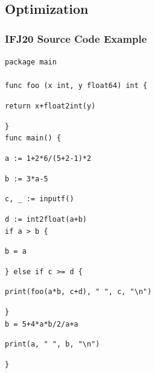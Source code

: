 \documentclass[12pt]{article}
\begin{document}
\begin{figure}
\subsection{Optimization}
\subsubsection{IFJ20 Source Code Example}
\texttt{package main}\\
\\
\texttt{func foo (x int, y float64) int \{}

\hspace{0.8cm}\texttt{return x+float2int(y)}

\texttt{\}}
\\

\texttt{func main() \{}

\hspace{0.8cm}\texttt{a := 1+2\**6/(5+2-1)\**2}

\hspace{0.8cm}\texttt{b := 3\**a-5}

\hspace{0.8cm}\texttt{c, \_ := inputf()}

\hspace{0.8cm}\texttt{d := int2float(a+b)}
\\

\hspace{0.8cm}\texttt{if a > b \{}

\hspace{1.6cm}\texttt{b = a}

\hspace{0.8cm}\texttt{\} else if c >= d \{}

\hspace{1.6cm}\texttt{print(foo(a\**b, c+d), " ", c, "\textbackslash n")}

\hspace{0.8cm}\texttt{\}}
\\

\hspace{0.8cm}\texttt{b = 5+4\**a\**b/2/a+a}

\hspace{0.8cm}\texttt{print(a, " ", b, "\textbackslash n")}

\texttt{\}}


\end{figure}
\end{document}
